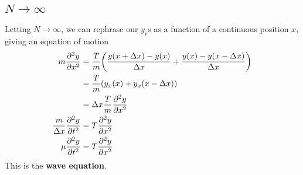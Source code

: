 \subsection{$N\to\infty$}
Letting $N\to\infty$, we can rephrase our $y_r$s as a function of a continuous position $x$, giving an equation of motion 
\begin{align*}
    m\pdv[2]{y}{x} &= \frac{T}{m}\pqty{\frac{y(x+\Delta x)-y(x)}{\Delta x} + \frac{y(x)-y(x-\Delta x)}{\Delta x}} \\
    &= \frac{T}{m}\pqty{y_x(x) + y_x(x-\Delta x)} \\
    &= \Delta x\frac{T}{m} \pdv[2]{y}{x} \\
    \frac{m}{\Delta x} \pdv[2]{y}{t} &= T\pdv[2]{y}{x} \\
    \mu\pdv[2]{y}{t} &= T\pdv[2]{y}{x}
\end{align*}
This is the \textbf{wave equation}.